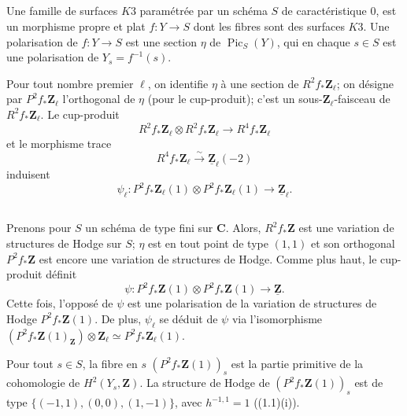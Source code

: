 \documentclass[11pt]{amsart}
\theoremstyle{plain}
\theoremstyle{definition}
\theoremstyle{remark}
\begin{document}
\subsection*{}
Une famille de surfaces $K3$ param\'etr\'ee par un sch\'ema $S$ de caract\'eristique $0$, est un morphisme propre et plat $f\colon Y\to S$ dont les fibres sont des surfaces $K3$. Une polarisation de $f\colon Y\to S$ est une section $\eta$ de $\operatorname{Pic}_S(Y)$, qui en chaque $s\in S$ est une polarisation de $Y_s=f^{-1}(s)$.

Pour tout nombre premier $\ell$, on identifie $\eta$ \`a une section de $R^2f_*\mathbf{Z}_\ell$; on d\'esigne par $P^2f_*\mathbf{Z}_\ell$ l'orthogonal de $\eta$ (pour le cup-produit); c'est un sous-$\mathbf{Z}_\ell$-faisceau de $R^2f_*\mathbf{Z}_\ell$. Le cup-produit
\begin{equation*}
R^2f_*\mathbf{Z}_\ell\otimes R^2f_*\mathbf{Z}_\ell\longrightarrow R^4f_*\mathbf{Z}_\ell
\end{equation*}
et le morphisme trace
\begin{equation*}
R^4f_*\mathbf{Z}_\ell\xrightarrow{\sim}\underline{\mathbf{Z}}_\ell(-2)
\end{equation*}
induisent
\begin{equation}\label{eq:6.2.1}
\psi_\ell\colon P^2f_*\mathbf{Z}_\ell(1)\otimes P^2f_*\mathbf{Z}_\ell(1)\longrightarrow\underline{\mathbf{Z}}_\ell.
\end{equation}

\subsection*{}
Prenons pour $S$ un sch\'ema de type fini sur $\mathbf{C}$. Alors, $R^2f_*\mathbf{Z}$ est une variation de structures de Hodge sur $S$; $\eta$ est en tout point de type $(1,1)$ et son orthogonal $P^2f_*\mathbf{Z}$ est encore une variation de structures de Hodge. Comme plus haut, le cup-produit d\'efinit
\begin{equation}\label{eq:6.3.1}
\psi\colon P^2f_*\mathbf{Z}(1)\otimes P^2f_*\mathbf{Z}(1)\longrightarrow\underline{\mathbf{Z}}.
\end{equation}
Cette fois, l'oppos\'e de $\psi$ est une polarisation de la variation de structures de Hodge $P^2f_*\mathbf{Z}(1)$. De plus, $\psi_\ell$ se d\'eduit de $\psi$ via l'isomorphisme $(P^2f_*\mathbf{Z}(1)_\mathbf{Z})\otimes\mathbf{Z}_\ell\simeq P^2f_*\mathbf{Z}_\ell(1)$.

Pour tout $s\in S$, la fibre en $s$ $(P^2f_*\mathbf{Z}(1))_s$ est la partie primitive de la cohomologie de $H^2(Y_s,\mathbf{Z})$. La structure de Hodge de $(P^2f_*\mathbf{Z}(1))_s$ est de type $\{(-1,1),(0,0),(1,-1)\}$, avec $h^{-1,1}=1$ ((1.1)(i)).
\end{document}
